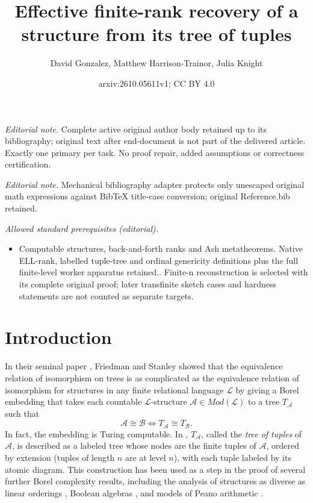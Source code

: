 \documentclass[10pt,a4paper]{article}
\title{Effective finite-rank recovery of a structure from its tree of tuples}
\author{David Gonzalez, Matthew Harrison-Trainor, Julia Knight}
\date{arxiv:2610.05611v1; CC BY 4.0}
\theoremstyle{definition}
\begin{document}
\maketitle
\noindent\textit{Editorial note.} Complete active original author body retained up to its bibliography; original text after end-document is not part of the delivered article. Exactly one primary per task. No proof repair, added assumptions or correctness certification.\par\medskip
\noindent\textit{Editorial note.} Mechanical bibliography adapter protects only unescaped original math expressions against BibTeX title-case conversion; original Reference.bib retained.\par\medskip
\noindent\textit{Allowed standard prerequisites (editorial).}\begin{itemize}
\item Computable structures, back-and-forth ranks and Ash metatheorems. Native ELL-rank, labelled tuple-tree and ordinal genericity definitions plus the full finite-level worker apparatus retained.. Finite-n reconstruction is selected with its complete original proof; later transfinite sketch cases and hardness statements are not counted as separate targets.
\end{itemize}\medskip
	\section{Introduction}
	
	In their seminal paper \cite{FriedmanStanley}, Friedman and Stanley showed that the equivalence relation of isomorphism on trees is as complicated as the equivalence relation of isomorphism for structures in any finite relational language $\mathcal{L}$ by giving a Borel embedding that takes each countable $\mathcal{L}$-structure $\mathcal{A} \in Mod(\mathcal{L})$ to a tree $T_{\mathcal{A}}$ such that
	\[ \mathcal{A} \cong \mathcal{B} \Longleftrightarrow T_{\mathcal{A}} \cong T_{\mathcal{B}}.\] In fact, the embedding is Turing computable. 
	In \cite{HTMontalban}, $T_{\mathcal{A}}$, called the \textit{tree of tuples} of $\mathcal{A}$, is described as a labeled tree whose nodes are the finite tuples of $\mathcal{A}$, ordered by extension (tuples of length $n$ are at level $n$), with each tuple labeled by its atomic diagram. This construction has been used as a step in the proof of several further Borel complexity results, including the analysis of structures as diverse as linear orderings \cite{FriedmanStanley}, Boolean algebras \cite{CamerloGao}, and models of Peano arithmetic \cite{MR,GLRS}. 
	
\end{document}

